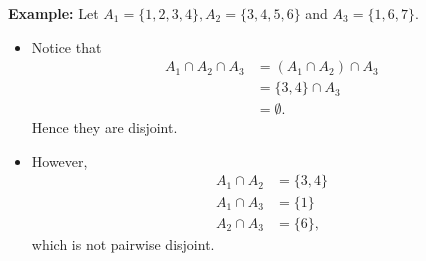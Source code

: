 \documentclass{article}
\theoremstyle{definition}
\begin{document}
\begin{solution}
\textbf{Example:} Let $A_1=\{1, 2, 3, 4\}, A_2=\{3, 4, 5, 6\}$ and $A_3=\{1, 6, 7\}$.
\begin{itemize}
\item Notice that 
\begin{align*}
A_1\cap A_2\cap A_3 &= (A_1\cap A_2)\cap A_3\\
&=\{3,4\}\cap A_3\\
&=\emptyset.
\end{align*} Hence they are disjoint.
\item However,
\begin{align*}
A_1\cap A_2 &=\{3, 4\}\\
A_1\cap A_3 &=\{1\}\\
A_2\cap A_3 &=\{6\},
\end{align*}
which is not pairwise disjoint.
\end{itemize}

\end{solution}
\end{document}
